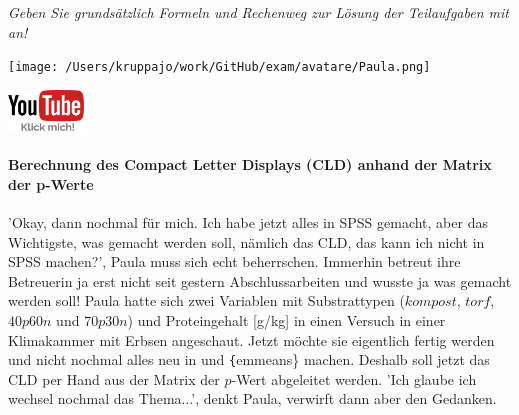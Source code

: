\documentclass[a4paper, 9pt]{scrartcl}\usepackage[]{graphicx}\usepackage[]{xcolor}
\begin{document}
\textit{Geben Sie grundsätzlich Formeln und Rechenweg zur Lösung der Teilaufgaben mit an!} \\[1Ex]
 

 
\ifcollection
\begin{flushright}
\tiny\vspace{-3Ex}
\textbf{\examinhaltstart}
\exammodulebiostat
\vspace{-4Ex}
\end{flushright}
\begin{minipage}[t]{0.5\textwidth}
\texttt{[image: /Users/kruppajo/work/GitHub/exam/avatare/Paula.png]}
\end{minipage}
\begin{minipage}[t]{0.5\textwidth}
\hfill
\href{https://youtu.be/RagTFFKFbFg}{\includegraphics[width = 2cm]{img/youtube}}
\end{minipage}
\vspace{-3ex}
\fi



\ifcollection
\paragraph{Berechnung des Compact Letter Displays (CLD) anhand der Matrix der p-Werte}
\fi

'Okay, dann nochmal für mich. Ich habe jetzt alles in SPSS gemacht, aber das Wichtigste, was gemacht werden soll, nämlich das CLD, das kann ich nicht in SPSS machen?', Paula muss sich echt beherrschen. Immerhin betreut ihre Betreuerin ja erst nicht seit gestern Abschlussarbeiten und wusste ja was gemacht werden soll! Paula hatte sich zwei Variablen mit Substrattypen ($kompost$, $torf$, $40p60n$ und $70p30n$) und Proteingehalt [g/kg] in einen Versuch in einer Klimakammer mit Erbsen angeschaut. Jetzt möchte sie eigentlich fertig werden und nicht nochmal alles neu in \Rlogo und \texttt\{emmeans\} machen. Deshalb soll jetzt das CLD per Hand aus der Matrix der $p$-Wert abgeleitet werden. 'Ich glaube ich wechsel nochmal das Thema...', denkt Paula, verwirft dann aber den Gedanken.
\end{document}
